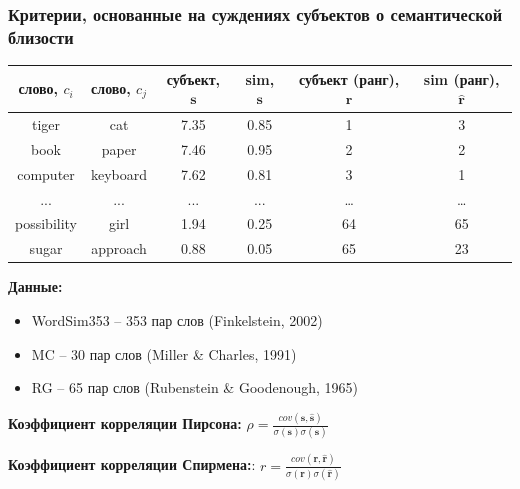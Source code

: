 \begin{frame}
\frametitle{Критерии, основанные на суждениях субъектов о семантической близости}

\begin{table}[h]\footnotesize
\begin{tabular}{ |c|c|c|c|c|c| }
\hline
  слово, $c_i$ & слово, $c_j$ & субъект, $\mathbf{s}$  & sim, $\mathbf{s}$  & субъект (ранг), $\mathbf{r}$ & sim (ранг), $\hat{\mathbf{r}}$  \\ \hline \hline
tiger & cat & 7.35 & 0.85 & 1 & 3 \\
book & paper & 7.46 &  0.95 & 2 & 2 \\
computer & keyboard & 7.62 &  0.81 & 3 & 1 \\
... & ... & ... & ...   & \ldots & \ldots \\
possibility & girl & 1.94 & 0.25 & 64 & 65 \\
sugar & approach & 0.88 & 0.05 & 65 & 23 \\ \hline
\end{tabular}
\end{table}


\textbf{Данные:}

\begin{itemize}
    \item WordSim353 -- 353 пар слов (Finkelstein, 2002)  
    \item MC -- 30 пар слов  (Miller & Charles, 1991)
    \item RG -- 65 пар слов (Rubenstein & Goodenough, 1965)  
\end{itemize}

\textbf{Коэффициент корреляции Пирсона:}  $\rho = \frac{cov(\mathbf{s},\hat{\mathbf{s}})}{\sigma(\mathbf{s}) \sigma(\hat{\mathbf{s}})}$

 \textbf{Коэффициент корреляции Спирмена:}: $r = \frac{cov(\mathbf{r},\hat{\mathbf{r}})}{\sigma(\mathbf{r}) \sigma(\hat{\mathbf{r}})}$
 
\end{frame}





